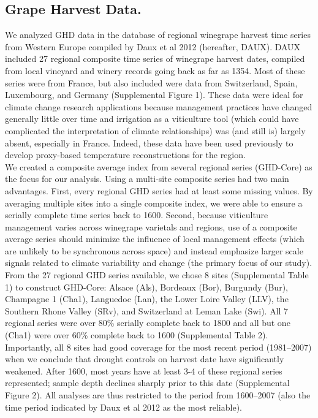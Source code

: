 \documentclass[final]{nature}
\begin{document}

\begin{methods}
\subsection{Grape Harvest Data.}
\noindent We analyzed GHD data in the database of regional winegrape harvest time series from Western Europe compiled by Daux et al 2012 (hereafter, DAUX\cite{Daux2012}). DAUX included 27 regional composite time series of winegrape harvest dates, compiled from local vineyard and winery records going back as far as 1354. Most of these series were from France, but also included were data from Switzerland, Spain, Luxembourg, and Germany (Supplemental Figure 1). These data were ideal for climate change research applications because management practices have changed generally little over time and irrigation as a viticulture tool (which could have complicated the interpretation of climate relationships) was (and still is) largely absent, especially in France. Indeed, these data have been used previously to develop proxy-based temperature reconstructions for the region\cite{Daux2012}.\\
\indent We created a composite average index from several regional series (GHD-Core) as the focus for our analysis. Using a multi-site composite series had two main advantages. First, every regional GHD series had at least some missing values. By averaging multiple sites into a single composite index, we were able to ensure a serially complete time series back to 1600. Second, because viticulture management varies across winegrape varietals and regions, use of a composite average series should minimize the influence of local management effects (which are unlikely to be synchronous across space) and instead emphasize larger scale signals related to climate variability and change (the primary focus of our study).\\
\indent From the 27 regional GHD series available, we chose 8 sites (Supplemental Table 1) to construct GHD-Core: Alsace (Als), Bordeaux (Bor), Burgundy (Bur), Champagne 1 (Cha1), Languedoc (Lan), the Lower Loire Valley (LLV), the Southern Rhone Valley (SRv), and Switzerland at Leman Lake (Swi). All 7 regional series were over 80\% serially complete back to 1800 and all but one (Cha1) were over 60\% complete back to 1600 (Supplemental Table 2). Importantly, all 8 sites had good coverage for the most recent period (1981--2007) when we conclude that drought controls on harvest date have significantly weakened. After 1600, most years have at least 3-4 of these regional series represented; sample depth declines sharply prior to this date (Supplemental Figure 2). All analyses are thus restricted to the period from 1600--2007 (also the time period indicated by Daux et al 2012 as the most reliable).\\

\end{methods}
\end{document}
